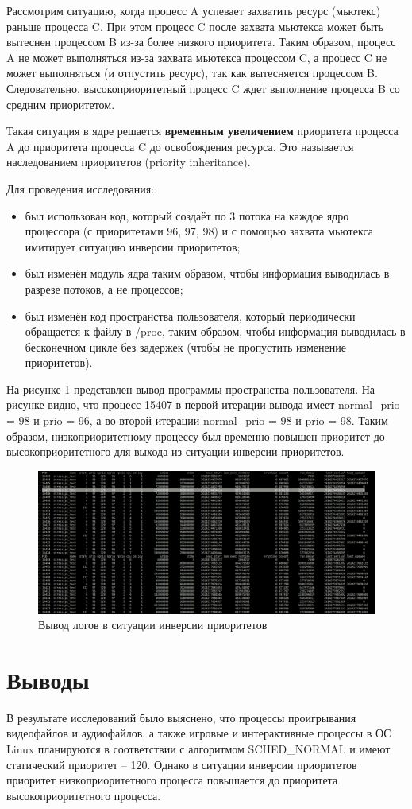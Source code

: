 Рассмотрим ситуацию, когда процесс A успевает захватить ресурс (мьютекс) раньше процесса C. При этом процесс C после захвата мьютекса может быть вытеснен процессом B из-за более низкого приоритета. Таким образом, процесс A не может выполняться из-за захвата мьютекса процессом C, а процесс C не может выполняться (и отпустить ресурс), так как вытесняется процессом B. Следовательно, высокоприоритетный процесс C ждет выполнение процесса B со средним приоритетом.

Такая ситуация в ядре решается \textbf{временным увеличением} приоритета процесса A до приоритета процесса C до освобождения ресурса. Это называется наследованием приоритетов (priority inheritance).

Для проведения исследования:
\begin{itemize}
    \item был использован код, который создаёт по 3 потока на каждое ядро процессора (с приоритетами 96, 97, 98) и с помощью захвата мьютекса имитирует ситуацию инверсии приоритетов;
    \item был изменён модуль ядра таким образом, чтобы информация выводилась в разрезе потоков, а не процессов;
    \item был изменён код пространства пользователя, который периодически обращается к файлу в /proc, таким образом, чтобы информация выводилась в бесконечном цикле без задержек (чтобы не пропустить изменение приоритетов).
\end{itemize}

На рисунке \ref{img:pi} представлен вывод программы пространства пользователя. На рисунке видно, что процесс 15407 в первой итерации вывода имеет normal\_prio = 98 и prio = 96, а во второй итерации normal\_prio = 98 и prio = 98. Таким образом, низкоприоритетному процессу был временно повышен приоритет до высокоприоритетного для выхода из ситуации инверсии приоритетов.

\begin{figure}[H]
	\centering
	\includegraphics[width=\linewidth]{img/pi.png}
	\caption{Вывод логов в ситуации инверсии приоритетов}
	\label{img:pi}
\end{figure}

\section*{Выводы}
В результате исследований было выяснено, что процессы проигрывания видеофайлов и аудиофайлов, а также игровые и интерактивные процессы в ОС Linux планируются в соответствии с алгоритмом SCHED\_NORMAL и имеют статический приоритет -- 120. Однако в ситуации инверсии приоритетов приоритет низкоприоритетного процесса повышается до приоритета высокоприоритетного процесса. 